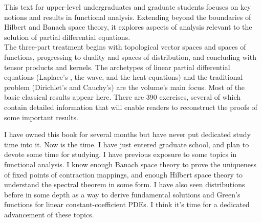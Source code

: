 \documentclass{../booknotes.cls}
\begin{document}
	\maketitle

	\begin{pubdescrip}
		This text for upper-level undergraduates and graduate students focuses on key notions and results in functional analysis. Extending beyond the boundaries of Hilbert and Banach space theory, it explores aspects of analysis relevant to the solution of partial differential equations. \\
		\indent The three-part treatment begins with topological vector spaces and spaces of functions, progressing to duality and spaces of distribution, and concluding with tensor products and kernels. The archetypes of linear partial differential equations (Laplace's , the wave, and the heat equations) and the traditional problem (Dirichlet's and Cauchy's) are the volume's main focus. Most of the basic classical results appear here. There are 390 exercises, several of which contain detailed information that will enable readers to reconstruct the proofs of some important results.
	\end{pubdescrip}

	\begin{transcribernote}
		\indent I have owned this book for several months but have never put dedicated study time into it. Now is the time. I have just entered graduate school, and plan to devote some time for studying. I have previous exposure to some topics in functional analysis. I know enough Banach space theory to prove the uniqueness of fixed points of contraction mappings, and enough Hilbert space theory to understand the spectral theorem in some form. I have also seen distributions before in some depth as a way to derive fundamental solutions and Green's functions for linear constant-coefficient PDEs. I think it's time for a dedicated advancement of these topics.
	\end{transcribernote}
	
	
	
\end{document}

